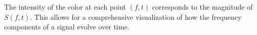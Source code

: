 The intensity of the color at each point \((f, t)\) corresponds to the magnitude of \(S(f, t)\). This allows for a comprehensive visualization of how the frequency components of a signal evolve over time.

